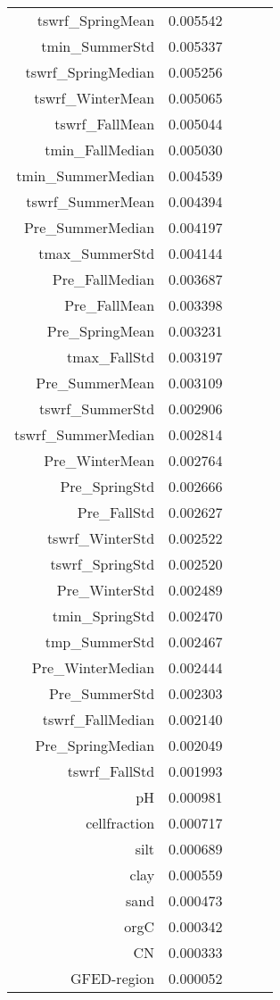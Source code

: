 \begin{table}[h]
\begin{tabular}{rrrrr}
tswrf_SpringMean & 0.005542 \\
tmin_SummerStd & 0.005337 \\
tswrf_SpringMedian & 0.005256 \\
tswrf_WinterMean & 0.005065 \\
tswrf_FallMean & 0.005044 \\
tmin_FallMedian & 0.005030 \\
tmin_SummerMedian & 0.004539 \\
tswrf_SummerMean & 0.004394 \\
Pre_SummerMedian & 0.004197 \\
tmax_SummerStd & 0.004144 \\
Pre_FallMedian & 0.003687 \\
Pre_FallMean & 0.003398 \\
Pre_SpringMean & 0.003231 \\
tmax_FallStd & 0.003197 \\
Pre_SummerMean & 0.003109 \\
tswrf_SummerStd & 0.002906 \\
tswrf_SummerMedian & 0.002814 \\
Pre_WinterMean & 0.002764 \\
Pre_SpringStd & 0.002666 \\
Pre_FallStd & 0.002627 \\
tswrf_WinterStd & 0.002522 \\
tswrf_SpringStd & 0.002520 \\
Pre_WinterStd & 0.002489 \\
tmin_SpringStd & 0.002470 \\
tmp_SummerStd & 0.002467 \\
Pre_WinterMedian & 0.002444 \\
Pre_SummerStd & 0.002303 \\
tswrf_FallMedian & 0.002140 \\
Pre_SpringMedian & 0.002049 \\
tswrf_FallStd & 0.001993 \\
pH & 0.000981 \\
cellfraction & 0.000717 \\
silt & 0.000689 \\
clay & 0.000559 \\
sand & 0.000473 \\
orgC & 0.000342 \\
CN & 0.000333 \\
GFED-region & 0.000052 \\
\bottomrule
\end{tabular}
\end{table}
